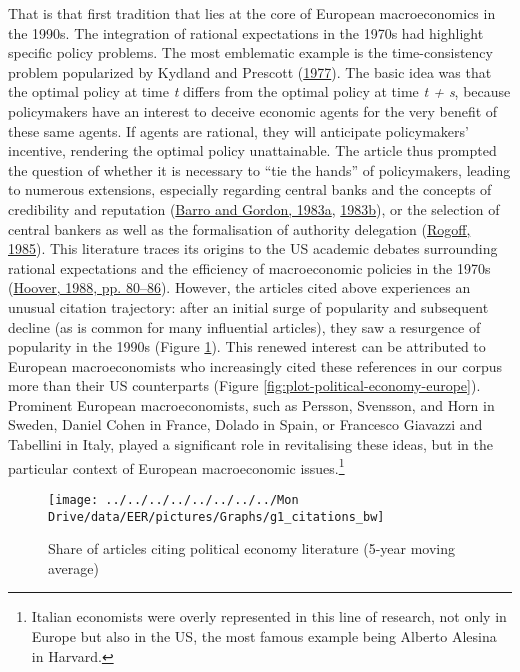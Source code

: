 \documentclass[
  12pt,
  onecolumn]{article}
\begin{document}
That is that first tradition that lies at the core of European macroeconomics in the 1990s. The integration of rational expectations in the 1970s had highlight specific policy problems. The most emblematic example is the time-consistency problem popularized by Kydland and Prescott (\protect\hyperlink{ref-kydland1977}{1977}). The basic idea was that the optimal policy at time \emph{t} differs from the optimal policy at time \emph{t + s}, because policymakers have an interest to deceive economic agents for the very benefit of these same agents. If agents are rational, they will anticipate policymakers' incentive, rendering the optimal policy unattainable. The article thus prompted the question of whether it is necessary to ``tie the hands'' of policymakers, leading to numerous extensions, especially regarding central banks and the concepts of credibility and reputation (\protect\hyperlink{ref-barro1983}{Barro and Gordon, 1983a}, \protect\hyperlink{ref-barro1983c}{1983b}), or the selection of central bankers as well as the formalisation of authority delegation (\protect\hyperlink{ref-rogoff1985b}{Rogoff, 1985}). This literature traces its origins to the US academic debates surrounding rational expectations and the efficiency of macroeconomic policies in the 1970s (\protect\hyperlink{ref-hoover1988}{Hoover, 1988, pp. 80--86}). However, the articles cited above experiences an unusual citation trajectory: after an initial surge of popularity and subsequent decline (as is common for many influential articles), they saw a resurgence of popularity in the 1990s (Figure \ref{fig:plot-political-economy}). This renewed interest can be attributed to European macroeconomists who increasingly cited these references in our corpus more than their US counterparts (Figure \ref{fig:plot-political-economy-europe}). Prominent European macroeconomists, such as Persson, Svensson, and Horn in Sweden, Daniel Cohen in France, Dolado in Spain, or Francesco Giavazzi and Tabellini in Italy, played a significant role in revitalising these ideas, but in the particular context of European macroeconomic issues.\footnote{Italian economists were overly represented in this line of research, not only in Europe but also in the US, the most famous example being Alberto Alesina in Harvard.}

\begin{figure}[H]

{\centering \texttt{[image: ../../../../../../../../Mon Drive/data/EER/pictures/Graphs/g1\_citations\_bw]} 

}

\caption{Share of articles citing political economy literature (5-year moving average)}\label{fig:plot-political-economy}
\end{figure}
\end{document}
